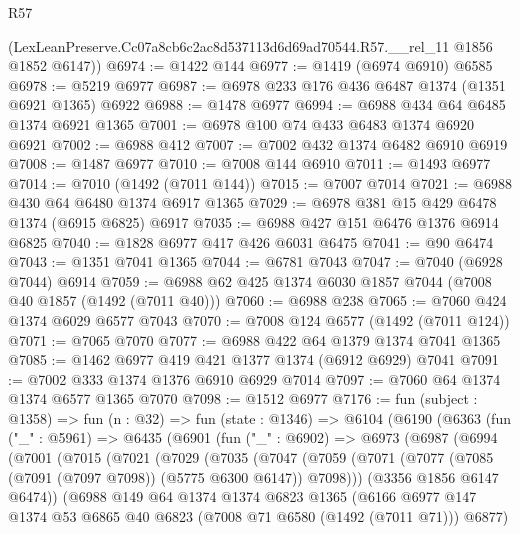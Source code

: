 \begin{lexlean}{R57}
\begin{coremodule}
      (LexLeanPreserve.Cc07a8cb6c2ac8d537113d6d69ad70544.R57.__rel_11 @1856 @1852 @6147))
@6974 := @1422 @144
@6977 := @1419 (@6974 @6910) @6585
@6978 := @5219 @6977
@6987 := @6978 @233 @176 @436 @6487 @1374 (@1351 @6921 @1365) @6922
@6988 := @1478 @6977
@6994 := @6988 @434 @64 @6485 @1374 @6921 @1365
@7001 := @6978 @100 @74 @433 @6483 @1374 @6920 @6921
@7002 := @6988 @412
@7007 := @7002 @432 @1374 @6482 @6910 @6919
@7008 := @1487 @6977
@7010 := @7008 @144 @6910
@7011 := @1493 @6977
@7014 := @7010 (@1492 (@7011 @144))
@7015 := @7007 @7014
@7021 := @6988 @430 @64 @6480 @1374 @6917 @1365
@7029 := @6978 @381 @15 @429 @6478 @1374 (@6915 @6825) @6917
@7035 := @6988 @427 @151 @6476 @1376 @6914 @6825
@7040 := @1828 @6977 @417 @426 @6031 @6475
@7041 := @90 @6474
@7043 := @1351 @7041 @1365
@7044 := @6781 @7043
@7047 := @7040 (@6928 @7044) @6914
@7059 := @6988 @62 @425 @1374 @6030 @1857 @7044 (@7008 @40 @1857 (@1492 (@7011 @40)))
@7060 := @6988 @238
@7065 := @7060 @424 @1374 @6029 @6577 @7043
@7070 := @7008 @124 @6577 (@1492 (@7011 @124))
@7071 := @7065 @7070
@7077 := @6988 @422 @64 @1379 @1374 @7041 @1365
@7085 := @1462 @6977 @419 @421 @1377 @1374 (@6912 @6929) @7041
@7091 := @7002 @333 @1374 @1376 @6910 @6929 @7014
@7097 := @7060 @64 @1374 @1374 @6577 @1365 @7070
@7098 := @1512 @6977
@7176 := fun (subject : @1358) =>
  fun (n : @32) =>
  fun (state : @1346) =>
  @6104
    (@6190
      (@6363
        (fun ("_" : @5961) =>
        @6435
          (@6901
            (fun ("_" : @6902) =>
            @6973
              (@6987
                (@6994
                  (@7001
                    (@7015
                      (@7021
                        (@7029
                          (@7035
                            (@7047
                              (@7059
                                (@7071
                                  (@7077 (@7085 (@7091 (@7097 @7098)) (@5775 @6300 @6147)) @7098)))
                              (@3356 @1856 @6147 @6474))
                            (@6988
                              @149
                              @64
                              @1374
                              @1374
                              @6823
                              @1365
                              (@6166
                                @6977
                                @147
                                @1374
                                @53
                                @6865
                                @40
                                @6823
                                (@7008 @71 @6580 (@1492 (@7011 @71)))
                                @6877)

\end{coremodule}
\end{lexlean}
